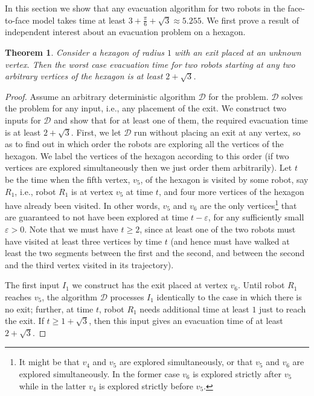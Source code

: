 \documentclass[
final
]{dmtcs-episciences}
\newcommand{\RA}{\ensuremath{R_1}}
\newcommand{\ff}{face-to-face }
\newtheorem{theorem}{Theorem}[section]
\theoremstyle{definition}
\begin{document}
In this section we show that any evacuation algorithm for
two robots in the \ff model takes time at least
$3+\frac{\pi}{6}  + \sqrt{3} \approx 5.255$. We first prove a result of independent interest about an evacuation problem on a hexagon. 
\begin{theorem}\label{thm:hexagon}
Consider a hexagon of radius $1$ with an exit placed at an unknown vertex.
Then the worst case evacuation time for two robots starting at any two  arbitrary vertices of the hexagon 
is at least $2 + \sqrt{3}$.
\end{theorem}
\begin{proof}
Assume an arbitrary deterministic algorithm $\mathcal D$ for the problem. 
$\mathcal D$ solves the problem for any input, i.e., any placement of the exit.
We construct two inputs for $\mathcal D$ and show that for at least one of them, the required evacuation time is at least $2 + \sqrt{3}$.
First, we let $\mathcal D$ run without placing an exit at any vertex, so as to 
find out in which order the robots are exploring all the vertices
of the hexagon. We label the vertices of the hexagon according to this order (if two vertices are explored simultaneously then we just order them arbitrarily).
Let $t$ be the time when the fifth vertex, $v_5$, of the hexagon is visited by some robot, say $\RA$, i.e., robot $\RA$ is at vertex $v_5$ at time $t$, and four more vertices of the hexagon have already been visited. In other words, $v_5$ and $v_6$ are the only vertices\footnote{It might be that $v_4$ and $v_5$ are explored simultaneously, or that $v_5$ and $v_6$ are explored simultaneously. In the former case $v_6$ is explored strictly after $v_5$ while in the latter $v_4$ is explored strictly before $v_5$.} 
that are guaranteed to not have been explored at time $t-\varepsilon$, for any sufficiently small $\varepsilon > 0$.
Note that we must have $t\geq2$, since at least one of the two robots must have visited at least three vertices by time $t$ (and hence must have walked at least the 
two segments between the first and the second, and between the second and the third vertex visited in its trajectory).
	
The first input $I_1$ we construct has the exit placed at vertex $v_6$. 
Until robot $\RA$ reaches $v_5$, the algorithm $\mathcal D$ 
processes $I_1$ identically to the case in which there is no exit; further, at time $t$, robot $\RA$ needs additional time at least $1$ just to reach the exit.
If $t \geq 1 + \sqrt{3}$, then this input gives an evacuation time of at least $2 + \sqrt{3}$. 


\end{proof}
\end{document}
